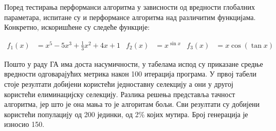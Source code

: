 \documentclass{article}
\begin{document}
\begin{center}
    \vspace*{8pt}
\end{center}


Поред тестирања перформанси алгоритма у зависности од вредности глобалних параметара, испитане
су и перформансе алгоритма над различитим функцијама. Конкретно, искоришћене су следеће функције: 

\begin{align*}
    f_1(x) &= x^5 - 5x^3 + \frac{1}{3} x^2 + 4x + 1 & f_2(x) &= x ^ {\sin x} & f_3(x) &= x \cos(\tan x)
\end{align*}

Пошто у раду ГА има доста насумичности, у табелама испод су приказане средње вредности одговарајућих
метрика након 100 итерација програма. У првој табели стоје резултати добијени користећи
једноставну селекцију а они у другој користећи елиминацијску селекцију. Разлика решења представља 
тачност алгоритма, јер што је она мања то је алгоритам бољи. Сви резултати су добијени користећи 
популацију од 200 јединки, од 2\% којих мутира. Број генерација је износио 150.
\end{document}
